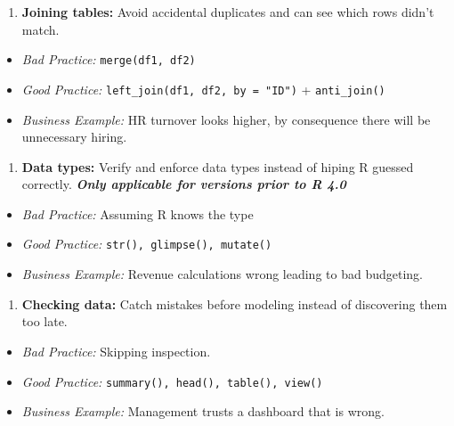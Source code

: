 \documentclass[
  stu,
  floatsintext,
  longtable,
  a4paper,
  nolmodern,
  notxfonts,
  notimes,
  colorlinks=true,linkcolor=blue,citecolor=blue,urlcolor=blue]{apa7}
\providecommand{\tightlist}{%
  \setlength{\itemsep}{0pt}\setlength{\parskip}{0pt}}
\begin{document}
\begin{enumerate}
\def\labelenumi{\arabic{enumi}.}
\setcounter{enumi}{2}
\tightlist
\item
  \textbf{Joining tables:} Avoid accidental duplicates and can see which
  rows didn't match.
\end{enumerate}

\begin{itemize}
\tightlist
\item
  \emph{Bad Practice:} \texttt{merge(df1,\ df2)}
\item
  \emph{Good Practice:} \texttt{left\_join(df1,\ df2,\ by\ =\ "ID")} +
  \texttt{anti\_join()}
\item
  \emph{Business Example:} HR turnover looks higher, by consequence
  there will be unnecessary hiring.
\end{itemize}

\begin{enumerate}
\def\labelenumi{\arabic{enumi}.}
\setcounter{enumi}{3}
\tightlist
\item
  \textbf{Data types:} Verify and enforce data types instead of hiping R
  guessed correctly. \textbf{\emph{Only applicable for versions prior to
  R 4.0}}
\end{enumerate}

\begin{itemize}
\tightlist
\item
  \emph{Bad Practice:} Assuming R knows the type
\item
  \emph{Good Practice:} \texttt{str(),\ glimpse(),\ mutate()}
\item
  \emph{Business Example:} Revenue calculations wrong leading to bad
  budgeting.
\end{itemize}

\begin{enumerate}
\def\labelenumi{\arabic{enumi}.}
\setcounter{enumi}{4}
\tightlist
\item
  \textbf{Checking data:} Catch mistakes before modeling instead of
  discovering them too late.
\end{enumerate}

\begin{itemize}
\tightlist
\item
  \emph{Bad Practice:} Skipping inspection.
\item
  \emph{Good Practice:} \texttt{summary(),\ head(),\ table(),\ view()}
\item
  \emph{Business Example:} Management trusts a dashboard that is wrong.
\end{itemize}
\end{document}
